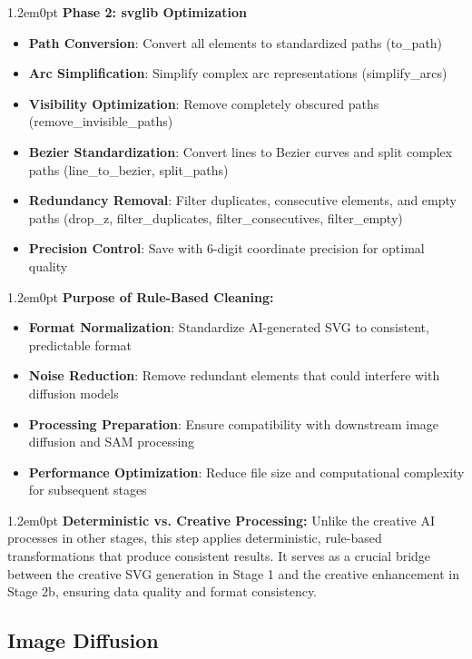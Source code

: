 \documentclass[10pt,a4paper]{article}
\newenvironment{bodytext}{\begin{adjustwidth}{1.2em}{0pt}}{\end{adjustwidth}}
\begin{document}
\begin{bodytext}
\textbf{Phase 2: svglib Optimization}
\begin{itemize}
\item \textbf{Path Conversion}: Convert all elements to standardized paths (to\_path)
\item \textbf{Arc Simplification}: Simplify complex arc representations (simplify\_arcs)
\item \textbf{Visibility Optimization}: Remove completely obscured paths (remove\_invisible\_paths)
\item \textbf{Bezier Standardization}: Convert lines to Bezier curves and split complex paths (line\_to\_bezier, split\_paths)
\item \textbf{Redundancy Removal}: Filter duplicates, consecutive elements, and empty paths (drop\_z, filter\_duplicates, filter\_consecutives, filter\_empty)
\item \textbf{Precision Control}: Save with 6-digit coordinate precision for optimal quality
\end{itemize}
\end{bodytext}

\begin{bodytext}
\textbf{Purpose of Rule-Based Cleaning:}
\begin{itemize}
\item \textbf{Format Normalization}: Standardize AI-generated SVG to consistent, predictable format
\item \textbf{Noise Reduction}: Remove redundant elements that could interfere with diffusion models
\item \textbf{Processing Preparation}: Ensure compatibility with downstream image diffusion and SAM processing
\item \textbf{Performance Optimization}: Reduce file size and computational complexity for subsequent stages
\end{itemize}
\end{bodytext}

\begin{bodytext}
\textbf{Deterministic vs. Creative Processing:} Unlike the creative AI processes in other stages, this step applies deterministic, rule-based transformations that produce consistent results. It serves as a crucial bridge between the creative SVG generation in Stage 1 and the creative enhancement in Stage 2b, ensuring data quality and format consistency.
\end{bodytext}

\subsection{Image Diffusion}
\end{document}
